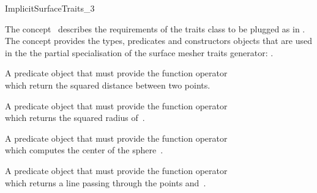 

\begin{ccRefConcept}{ImplicitSurfaceTraits_3}

\ccDefinition
  
The concept \ccRefName\  describes the requirements of the traits class to
be plugged  as  in .
The concept provides the types, predicates and constructors objects
that are  used in the 
the partial specialisation  of 
the  surface mesher traits generator:
.




\ccTypes

\ccGlue
{}
\ccGlue
{}
\ccGlue
{}
\ccGlue
{}
\ccGlue
{}
\ccGlue
{}


{A predicate object that must provide the function operator\\
 which return the squared distance
between two points.}

{A predicate object that must provide the function operator\\
 which returns the squared radius
of~.}


{A predicate object that must provide the function operator\\
 which computes the center of
the sphere~.}

{A predicate object that must provide the function operator\\
 which
returns a line  passing through the points  and~.}


\end{ccRefConcept}
